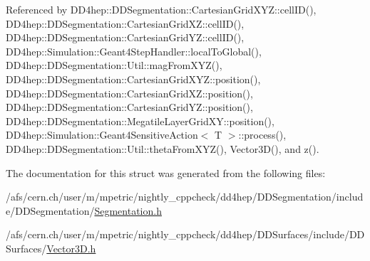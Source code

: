 Referenced by D\+D4hep\+::\+D\+D\+Segmentation\+::\+Cartesian\+Grid\+X\+Y\+Z\+::cell\+I\+D(), D\+D4hep\+::\+D\+D\+Segmentation\+::\+Cartesian\+Grid\+X\+Z\+::cell\+I\+D(), D\+D4hep\+::\+D\+D\+Segmentation\+::\+Cartesian\+Grid\+Y\+Z\+::cell\+I\+D(), D\+D4hep\+::\+Simulation\+::\+Geant4\+Step\+Handler\+::local\+To\+Global(), D\+D4hep\+::\+D\+D\+Segmentation\+::\+Util\+::mag\+From\+X\+Y\+Z(), D\+D4hep\+::\+D\+D\+Segmentation\+::\+Cartesian\+Grid\+X\+Y\+Z\+::position(), D\+D4hep\+::\+D\+D\+Segmentation\+::\+Cartesian\+Grid\+X\+Z\+::position(), D\+D4hep\+::\+D\+D\+Segmentation\+::\+Cartesian\+Grid\+Y\+Z\+::position(), D\+D4hep\+::\+D\+D\+Segmentation\+::\+Megatile\+Layer\+Grid\+X\+Y\+::position(), D\+D4hep\+::\+Simulation\+::\+Geant4\+Sensitive\+Action$<$ T $>$\+::process(), D\+D4hep\+::\+D\+D\+Segmentation\+::\+Util\+::theta\+From\+X\+Y\+Z(), Vector3\+D(), and z().



The documentation for this struct was generated from the following files\+:\begin{DoxyCompactItemize}
\item 
/afs/cern.\+ch/user/m/mpetric/nightly\+\_\+cppcheck/dd4hep/\+D\+D\+Segmentation/include/\+D\+D\+Segmentation/\hyperlink{_segmentation_8h}{Segmentation.\+h}\item 
/afs/cern.\+ch/user/m/mpetric/nightly\+\_\+cppcheck/dd4hep/\+D\+D\+Surfaces/include/\+D\+D\+Surfaces/\hyperlink{_vector3_d_8h}{Vector3\+D.\+h}\end{DoxyCompactItemize}
